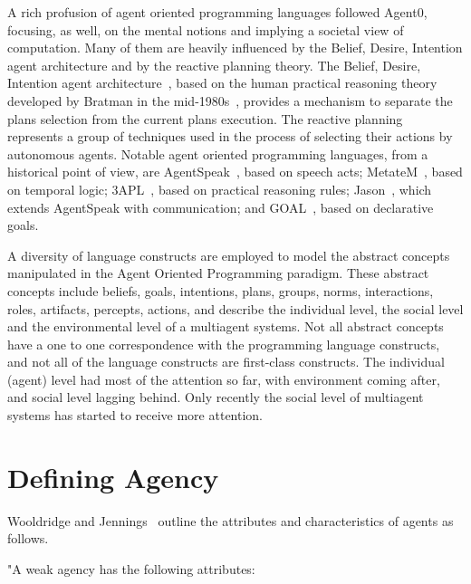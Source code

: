 \documentclass[a4paper,12pt,oneside,fleqn]{book} %
\begin{document}
A rich profusion of agent oriented programming languages followed Agent0,
focusing, as well, on the mental notions and implying a societal view of
computation.  Many of them are heavily influenced by the Belief, Desire,
Intention agent architecture and by the reactive planning theory.  The
Belief, Desire, Intention agent architecture~\cite{DBLP:conf/icmas/RaoG95},
based on the human practical reasoning theory developed by Bratman in the
mid-1980s~\cite{Bratman:1999}, provides a mechanism to separate the plans
selection from the current plans execution.  The reactive
planning~\cite{DBLP:conf/aaai/GeorgeffL87} represents a group of techniques
used in the process of selecting their actions by autonomous agents.
Notable agent oriented programming languages, from a historical point of
view, are AgentSpeak~\cite{DBLP:conf/maamaw/Rao96}, based on speech acts;
MetateM~\cite{DBLP:conf/promas/Fisher05}, based on temporal logic;
3APL~\cite{DBLP:conf/promas/DastaniRDM03}, based on practical reasoning
rules; Jason~\cite{DBLP:books/sp/map2005/BordiniHV05}, which extends
AgentSpeak with communication; and
GOAL~\cite{DBLP:journals/corr/cs-AI-0207008}, based on declarative goals.

A diversity of language constructs are employed to model the abstract
concepts manipulated in the Agent Oriented Programming paradigm. These
abstract concepts include beliefs, goals, intentions, plans, groups, norms,
interactions, roles, artifacts, percepts, actions, and describe the
individual level, the social level and the environmental level of a
multiagent systems. Not all abstract concepts have a one to one
correspondence with the programming language constructs, and not all of the
language constructs are first-class constructs. The individual (agent) level
had most of the attention so far, with environment coming after, and social
level lagging behind. Only recently the social level of multiagent systems
has started to receive more attention.
\section{Defining Agency} %

Wooldridge and Jennings~\cite{DBLP:journals/ker/WooldridgeJ95} outline the
attributes and characteristics of agents as follows.

"A weak agency has the following attributes:
\end{document}
